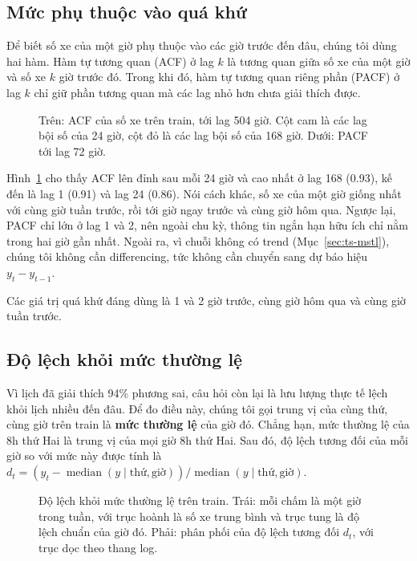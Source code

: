 \subsection{Mức phụ thuộc vào quá khứ}
\label{sec:ts-acf}
Để biết số xe của một giờ phụ thuộc vào các giờ trước đến đâu, chúng tôi dùng hai hàm. Hàm tự tương quan (ACF) ở lag $k$ là tương quan
giữa số xe của một giờ và số xe $k$ giờ trước đó. Trong khi đó, hàm tự tương quan riêng phần (PACF) ở lag $k$ chỉ giữ phần tương quan mà
các lag nhỏ hơn chưa giải thích được.

\begin{figure}[H]
\centering
{}
\caption{Trên: ACF của số xe trên train, tới lag 504 giờ. Cột cam là các lag bội số của 24 giờ, cột đỏ là các lag bội số của 168 giờ.
Dưới: PACF tới lag 72 giờ.}
\label{fig:ts-acf}
\end{figure}

Hình~\ref{fig:ts-acf} cho thấy ACF lên đỉnh sau mỗi 24 giờ và cao nhất ở lag 168 (0.93), kế đến là lag 1 (0.91) và lag 24 (0.86). Nói
cách khác, số xe của một giờ giống nhất với cùng giờ tuần trước, rồi tới giờ ngay trước và cùng giờ hôm qua. Ngược lại, PACF chỉ lớn ở lag 1
và 2, nên ngoài chu kỳ, thông tin ngắn hạn hữu ích chỉ nằm trong hai giờ gần nhất. Ngoài ra, vì chuỗi không có trend (Mục~\ref{sec:ts-mstl}),
chúng tôi không cần differencing, tức không cần chuyển sang dự báo hiệu $y_t - y_{t-1}$.

\begin{tsinsight}
Các giá trị quá khứ đáng dùng là 1 và 2 giờ trước, cùng giờ hôm qua và cùng giờ tuần trước.
\end{tsinsight}

\subsection{Độ lệch khỏi mức thường lệ}
\label{sec:ts-spread}
Vì lịch đã giải thích 94\% phương sai, câu hỏi còn lại là lưu lượng thực tế lệch khỏi lịch nhiều đến đâu. Để đo điều này, chúng tôi gọi
trung vị của cùng thứ, cùng giờ trên train là \textbf{mức thường lệ} của giờ đó. Chẳng hạn, mức thường lệ của 8h thứ Hai là trung vị của mọi
giờ 8h thứ Hai. Sau đó, độ lệch tương đối của mỗi giờ so với mức này được tính là
$d_t = \left(y_t - \operatorname{median}(y \mid \text{thứ}, \text{giờ})\right) / \operatorname{median}(y \mid \text{thứ}, \text{giờ})$.

\begin{figure}[H]
\centering
{}
\caption{Độ lệch khỏi mức thường lệ trên train. Trái: mỗi chấm là một giờ trong tuần, với trục hoành là số xe trung bình và trục tung là
độ lệch chuẩn của giờ đó. Phải: phân phối của độ lệch tương đối $d_t$, với trục dọc theo thang log.}
\label{fig:ts-spread}
\end{figure}

